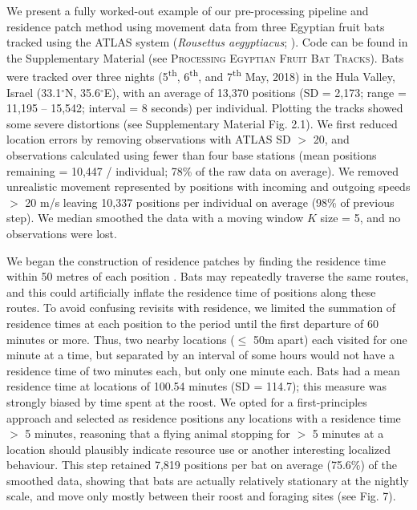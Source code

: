 \documentclass[10pt,paper=a4,headings=standardclasses
]{scrartcl}
\begin{document}
We present a fully worked-out example of our pre-processing pipeline and residence patch method using movement data from three Egyptian fruit bats tracked using the ATLAS system (\textit{Rousettus aegyptiacus}; \citet{toledo2020}).
Code can be found in the Supplementary Material (see \textsc{Processing Egyptian Fruit Bat Tracks}).
Bats were tracked over three nights (5\textsuperscript{th}, 6\textsuperscript{th}, and 7\textsuperscript{th} May, 2018) in the Hula Valley, Israel (33.1$^{\circ}$N, 35.6$^{\circ}$E), with an average of 13,370 positions (SD = 2,173; range = 11,195 -- 15,542; interval = 8 seconds) per individual.
Plotting the tracks showed some severe distortions (see Supplementary Material Fig. 2.1).
We first reduced location errors by removing observations with ATLAS SD $>$ 20, and observations calculated using fewer than four base stations (mean positions remaining = 10,447 / individual; 78\% of the raw data on average).
We removed unrealistic movement represented by positions with incoming and outgoing speeds $>$ 20 m/s leaving 10,337 positions per individual on average (98\% of previous step).
We median smoothed the data with a moving window $K$ size = 5, and no observations were lost.

We began the construction of residence patches by finding the residence time within 50 metres of each position \citep{bracis2018}.
Bats may repeatedly traverse the same routes, and this could artificially inflate the residence time of positions along these routes.
To avoid confusing revisits with residence, we limited the summation of residence times at each position to the period until the first departure of 60 minutes or more.
Thus, two nearby locations ($\leq$ 50m apart) each visited for one minute at a time, but separated by an interval of some hours would not have a residence time of two minutes each, but only one minute each.
Bats had a mean residence time at locations of 100.54 minutes (SD = 114.7); this measure was strongly biased by time spent at the roost.
We opted for a first-principles approach and selected as residence positions any locations with a residence time $>$ 5 minutes, reasoning that a flying animal stopping for $>$ 5 minutes at a location should plausibly indicate resource use or another interesting localized behaviour.
This step retained 7,819 positions per bat on average (75.6\%) of the smoothed data, showing that bats are actually relatively stationary at the nightly scale, and move only mostly between their roost and foraging sites (see Fig. 7).
\end{document}
